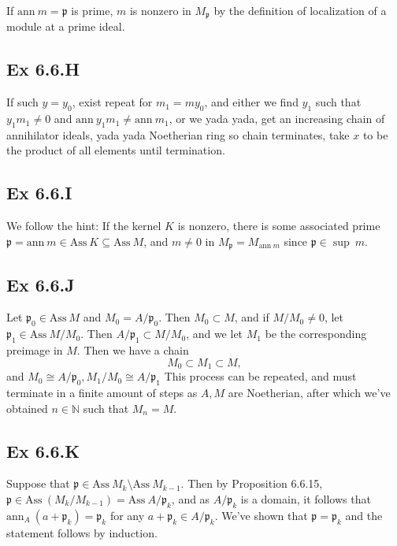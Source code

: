 \documentclass{article}
\theoremstyle{definition}
\newcommand{\N}{\mathbb{N}}
\newcommand{\ann}{\text{ann}}
\newcommand{\Ass}{\text{Ass}}
\begin{document}
If $\ann\ m = \mathfrak{p}$ is prime, $m$ is nonzero in $M_{\mathfrak{p}}$ by
the definition of localization of a module at a prime ideal.

\subsection*{Ex 6.6.H}

If such $y = y_{0}$, exist repeat for $m_{1} = m y_{0}$, and either we find
$y_{1}$ such that $y_{1}m_{1} \not = 0$ and $\ann\ y_{1}m_{1} \not = \ann\
	m_{1}$, or we yada yada, get an increasing chain of annihilator ideals, yada
yada Noetherian ring so chain terminates, take $x$ to be the product of all
elements until termination. \\

\subsection*{Ex 6.6.I}

We follow the hint: If the kernel $K$ is nonzero, there is some associated
prime $\mathfrak{p} = \ann\ m \in \Ass\ K \subseteq \Ass\ M$, and $m \not = 0$
in $M_{\mathfrak{p}} = M_{\ann\ m}$ since $\mathfrak{p} \in \sup\ m$.

\subsection*{Ex 6.6.J}

Let $\mathfrak{p}_{0} \in \Ass\ M$ and $M_{0} = A/\mathfrak{p}_{0}$. Then
$M_{0} \subset M$, and if $M/M_{0} \not = 0$, let $\mathfrak{p}_{1} \in \Ass\
	M/M_{0}$. Then $A/\mathfrak{p}_{1} \subset M/M_{0}$, and we let $M_{1}$ be the
corresponding preimage in $M$. Then we have a chain
\[
	M_{0} \subset M_{1} \subset M,
\]
and $M_{0} \cong A/\mathfrak{p}_{0}, M_{1}/M_{0} \cong A/\mathfrak{p}_{1}$ This
process can be repeated, and must terminate in a finite amount of steps as $A,
	M$ are Noetherian, after which we've obtained $n \in \N$ such that $M_n = M$.

\subsection*{Ex 6.6.K}

Suppose that $\mathfrak{p} \in \Ass\ M_k \setminus \Ass\ M_{k-1}$. Then by
Proposition 6.6.15, $\mathfrak{p} \in \Ass\ (M_k/M_{k-1}) = \Ass\
	A/\mathfrak{p}_k$, and as $A/\mathfrak{p}_k$ is a domain, it follows that
$\ann_A\ (a + \mathfrak{p}_k) = \mathfrak{p}_k$ for any $a + \mathfrak{p}_k
	\in A/\mathfrak{p}_k$. We've shown that $\mathfrak{p} = \mathfrak{p}_k$ and the
statement follows by induction.
\end{document}
